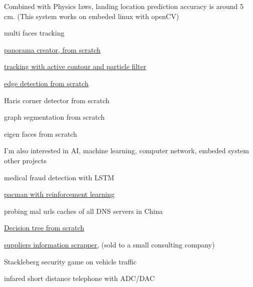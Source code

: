\begin{cventries}
{\begin{cvitems}
{{        Combined with Physics laws, landing location prediction accuracy is around 5 cm. 
        (This system works on embeded linux with openCV)}}
        \item {multi faces tracking}
        \item {\href{https://github.com/yihui-he/panorama}{panorama creator, from scratch}\\
        \color{lightgray}{
        First, to reorder shuffled images, I match SIFT features pairs between each couple of input images. Naive bayes is employed to determine order 
        from multi proposals. Then cylindrical coordinate and RANSAC are used to estimate transformation. Finally, merge image using $\alpha$ blending.}}
        \item {\href{https://github.com/yihui-he/lip-tracking-with-snake-active-contour-and-particle-filter}
        {tracking with active contour and particle filter}}
        \item {\href{https://github.com/yihui-he/Edge-detection-with-zero-crossing}{edge detection from scratch}}
        \item {Haris corner detector from scratch}
        \item {graph segmentation from scratch}
        \item {eigen faces from scratch}
      \end{cvitems}
    }


  \cventry
    {I'm also interested in AI, machine learning, computer network, embeded system} %
    {other projects} %
    { } %
    { } %
    {
      \begin{cvitems} %
        \item {medical fraud detection with LSTM}
        \item {\href{https://github.com/yihui-he/AI-CS_188}{pacman with reinforcement learning}}
        \item {probing  mal urls caches of all DNS servers in China\href{https://github.com/yihui-he/DNS_query_Cpp}{}}
	\item {\href{https://github.com/yihui-he/Decision-tree}{Decision tree from scratch}}
        \item {\href{https://github.com/yihui-he/Alibaba-supplier-info-Scrapper}{suppliers information scrapper}, (sold to a small consulting company)}
        \item {Stackleberg security game on vehicle traffic}
        \item {infared short distance telephone with ADC/DAC}
      \end{cvitems}
    }

\end{cventries}
